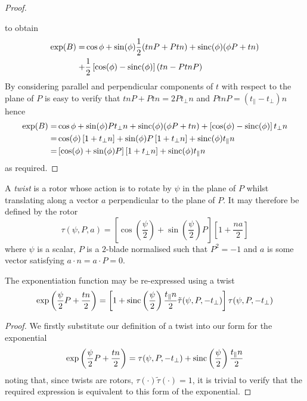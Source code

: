 \begin{proof}
\begin{centering}
\end{centering}

\noindent to obtain
\begin{align*}
\exp(B) = & 
  \cos \phi + \sin(\phi) \frac{1}{2} (tnP + Ptn) + \mathrm{sinc}(\phi) (\phi P + tn) \\
+ & \frac{1}{2} \left[ \cos(\phi) - \mathrm{sinc}(\phi) \right] (tn - PtnP)
\end{align*}
By considering parallel and perpendicular components of $t$ with
respect to the plane of $P$ is easy to verify that
$tnP + Ptn = 2 Pt_\perp n$ and $PtnP = (t_\parallel - t_\perp)n$ hence
\begin{align*}
\exp(B) = & 
  \cos \phi + \sin(\phi) P t_\perp n + \mathrm{sinc}(\phi) (\phi P + tn) + \left[ \cos(\phi) - \mathrm{sinc}(\phi) \right] t_\perp n \\
  = & \cos (\phi) \left[ 1 + t_\perp n \right] +
  \sin(\phi) P \left[ 1 + t_\perp n \right] + \mathrm{sinc}(\phi) t_\parallel n \\
  = & \left[ \cos(\phi) + \sin(\phi) P \right] \left[ 1 + t_\perp n \right] + \mathrm{sinc}(\phi) t_\parallel n 
\end{align*}
as required.
\end{proof}

\begin{definition}
A \emph{twist} is a rotor whose action is to rotate by $\psi$ in the 
plane of $P$ whilst translating along a vector $a$ perpendicular to
the plane of $P$. It may therefore be 
defined by the rotor 
\[
\tau(\psi, P, a) =
 \left[ \cos\left(\frac{\psi}{2}\right) +
   \sin\left(\frac{\psi}{2}\right)P
 \right]
 \left[
   1 + \frac{na}{2}
 \right]
\]
where $\psi$ is a scalar, $P$ is a $2$-blade normalised such that 
$P^2 = -1$ and $a$ is some vector satisfying $a \cdot n = a \cdot P = 0$.
\end{definition}

\begin{lemma}
The exponentiation function may be re-expressed using a twist
\[
\exp\left(\frac{\psi}{2}P + \frac{tn}{2}\right) =
\left[ 1 + \mathrm{sinc}\left(\frac{\psi}{2}\right)\frac{t_\parallel n}{2} \tilde{\tau}(\psi, P, - t_\perp) \right]
\tau(\psi, P, - t_\perp)
\]
\end{lemma}
\begin{proof}
We firstly substitute our definition of a twist into our form for the exponential
\begin{equation}
\exp\left(\frac{\psi}{2}P + \frac{tn}{2}\right) =
\tau(\psi, P, - t_\perp) + \mathrm{sinc}\left(\frac{\psi}{2}\right)\frac{t_\parallel n}{2}
\label{eqn:twistform}
\end{equation}
noting that, since twists are rotors, $\tau( \cdot ) \tilde{\tau}(\cdot) = 1$, it is
trivial to verify that the required expression is equivalent to this form of the exponential.
\end{proof}


